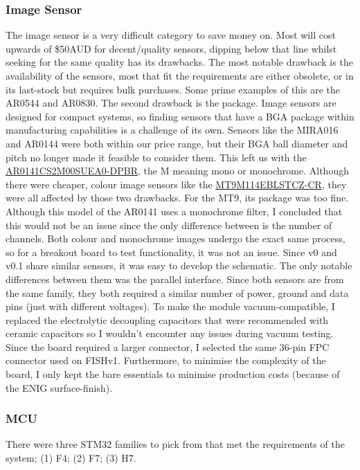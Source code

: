 \documentclass[10pt]{article}
\newcommand{\nl}{\newline \newline}
\begin{document}
\subsubsection{Image Sensor}
The image sensor is a very difficult category to save money on. Most will cost upwards of \$50AUD for decent/quality sensors, dipping below that line whilst seeking for the same quality has its drawbacks.
The most notable drawback is the availability of the sensors, most that fit the requirements are either obsolete, or in its last-stock but requires bulk purchases. Some prime examples of this are the AR0544 and AR0830.
The second drawback is the package. Image sensors are designed for compact systems, so finding sensors that have a BGA package within manufacturing capabilities is a challenge of its own. Sensors like the MIRA016 and AR0144 were both within our price range, but their BGA ball diameter and pitch no longer made it feasible to consider them.
This left us with the \href{https://www.digikey.com.au/en/products/detail/onsemi/AR0141CS2M00SUEA0-DPBR/7221099}{AR0141CS2M00SUEA0-DPBR}, the M meaning mono or monochrome. Although there were cheaper, colour image sensors like the \href{https://www.digikey.com.au/en/products/detail/onsemi/MT9M114EBLSTCZ-CR/5321744}{MT9M114EBLSTCZ-CR}, they were all affected by those two drawbacks. For the MT9, its package was too fine.
\nl
Although this model of the AR0141 uses a monochrome filter, I concluded that this would not be an issue since the only difference between is the number of channels. Both colour and monochrome images undergo the exact same process, so for a breakout board to test functionality, it was not an issue.
\nl
Since v0 and v0.1 share similar sensors, it was easy to develop the schematic. The only notable differences between them was the parallel interface. Since both sensors are from the same family, they both required a similar number of power, ground and data pins (just with different voltages).
\nl
To make the module vacuum-compatible, I replaced the electrolytic decoupling capacitors that were recommended with ceramic capacitors so I wouldn't encounter any issues during vacuum testing.
\nl
Since the board required a larger connector, I selected the same 36-pin FPC connector used on FISHv1.
Furthermore, to minimise the complexity of the board, I only kept the bare essentials to minimise production costs (because of the ENIG surface-finish).

\subsubsection{MCU}
There were three STM32 families to pick from that met the requirements of the system; (1) F4; (2) F7; (3) H7.
\end{document}
